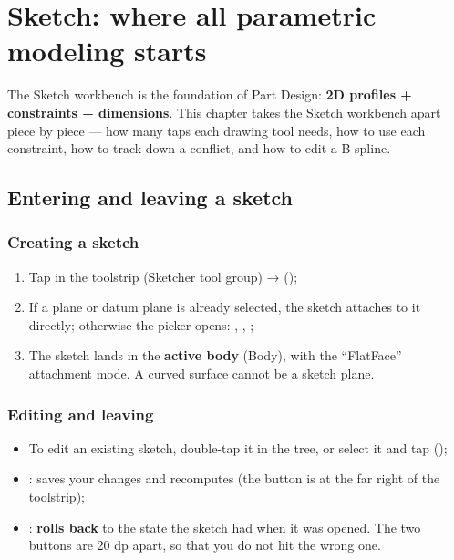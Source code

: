 \chapter{Sketch: where all parametric modeling starts}

The Sketch workbench is the foundation of Part Design: \textbf{2D profiles + constraints + dimensions}. This chapter takes
the Sketch workbench apart piece by piece --- how many taps each drawing tool needs, how to use each constraint, how to
track down a conflict, and how to edit a B-spline.

\section{Entering and leaving a sketch}

\subsection{Creating a sketch}

\begin{enumerate}
  \item Tap  in the toolstrip (Sketcher tool group) →  ();
  \item If a plane or datum plane is already selected, the sketch attaches to it directly; otherwise the 
        picker opens: , , ;
  \item The sketch lands in the \textbf{active body} (Body), with the ``FlatFace'' attachment mode. A curved surface
        cannot be a sketch plane.
\end{enumerate}

\subsection{Editing and leaving}

\begin{itemize}
  \item To edit an existing sketch, double-tap it in the tree, or select it and tap  ();
  \item {}: saves your changes and recomputes (the button is at the far right of the toolstrip);
  \item {}: \textbf{rolls back} to the state the sketch had when it was opened. The two buttons are
        20 dp apart, so that you do not hit the wrong one.
\end{itemize}

